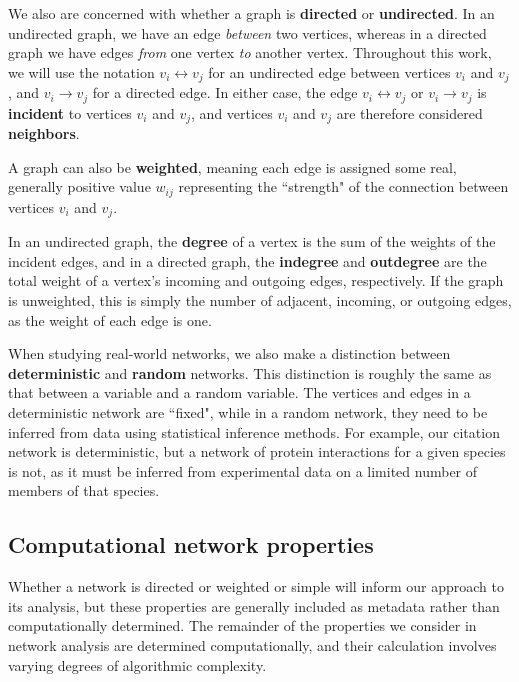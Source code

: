 \documentclass[12pt]{thesis}
\theoremstyle{plain}
\theoremstyle{definition}
\theoremstyle{remark}
\begin{document}
We also are concerned with whether a graph is \textbf{directed} or \textbf{undirected}. In an undirected graph, we have an edge \textit{between} two vertices, whereas in a directed graph we have edges \textit{from} one vertex \textit{to} another vertex. Throughout this work, we will use the notation $v_i \leftrightarrow v_j$ for an undirected edge between vertices $v_i$ and $v_j$, and $v_i \rightarrow v_j$ for a directed edge. In either case, the edge $v_i\leftrightarrow v_j$ or $v_i\rightarrow v_j$ is \textbf{incident} to vertices $v_i$ and $v_j$, and vertices $v_i$ and $v_j$ are therefore considered \textbf{neighbors}.

A graph can also be \textbf{weighted}, meaning each edge is assigned some real, generally positive value $w_{ij}$ representing the ``strength" of the connection between vertices $v_i$ and $v_j$. 

In an undirected graph, the \textbf{degree} of a vertex is the sum of the weights of the incident edges, and in a directed graph, the \textbf{indegree} and \textbf{outdegree} are the total weight of a vertex's incoming and outgoing edges, respectively. If the graph is unweighted, this is simply the number of adjacent, incoming, or outgoing edges, as the weight of each edge is one.

When studying real-world networks, we also make a distinction between \textbf{deterministic} and \textbf{random} networks. This distinction is roughly the same as that between a variable and a random variable. The vertices and edges in a deterministic network are ``fixed", while in a random network, they need to be inferred from data using statistical inference methods. For example, our citation network is deterministic, but a network of protein interactions for a given species is not, as it must be inferred from experimental data on a limited number of members of that species.

\subsection{Computational network properties}
Whether a network is directed or weighted or simple will inform our approach to its analysis, but these properties are generally included as metadata rather than computationally determined. The remainder of the properties we consider in network analysis are determined computationally, and their calculation involves varying degrees of algorithmic complexity.
\end{document}
